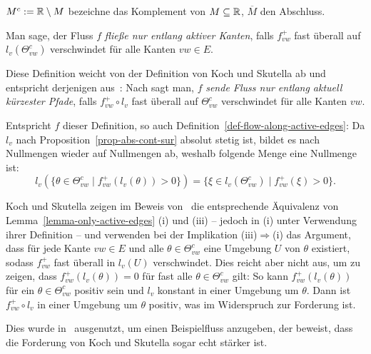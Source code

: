 \begin{notation}
	 $M^c:= \mathbb{R}\setminus M$ bezeichne das Komplement von $M\subseteq\mathbb{R}$, $\overline{M}$ den Abschluss.
\end{notation}

\begin{definition}\label{def-flow-along-active-edges}
	Man sage, der Fluss $f$ \emph{fließe nur entlang aktiver Kanten}, falls $f_{vw}^+$ fast überall auf $l_v(\Theta_{vw}^c)$ verschwindet für alle Kanten $vw\in E$.
\end{definition}

\begin{remark}
	Diese Definition weicht von der Definition von Koch und Skutella ab und entspricht derjenigen aus~\cite[Definition 1]{Cominetti2015}:
	Nach \cite[Definition 2]{Koch2011} sagt man, $f$ \emph{sende Fluss nur entlang aktuell kürzester Pfade}, falls $f_{vw}^+\circ l_v$ fast überall auf $\Theta_{vw}^c$ verschwindet für alle Kanten $vw$.

	Entspricht $f$ dieser Definition, so auch Definition~\ref{def-flow-along-active-edges}: 
	Da $l_v$ nach Proposition~\ref{prop-abs-cont-sur} absolut stetig ist, bildet es nach~\cite[Aufgabe 4.9]{Elstrodt2011Abs} Nullmengen wieder auf Nullmengen ab, weshalb folgende Menge eine Nullmenge ist: \[ l_v(\{ \theta \in \Theta_{vw}^c \mid f_{vw}^+ (l_v(\theta)) > 0 \}) = \{ \xi \in l_v(\Theta_{vw}^c) \mid f_{vw}^+ (\xi) > 0 \}. \]
	 
	Koch und Skutella zeigen im Beweis von~\cite[Lemma 1]{Koch2011} die entsprechende Äquivalenz von Lemma~\ref{lemma-only-active-edges} (i) und (iii) -- jedoch in (i) unter Verwendung ihrer Definition -- und
	verwenden bei der Implikation (iii)$\Rightarrow$(i) das Argument, dass für jede Kante $vw\in E$ und alle $\theta\in \Theta_{vw}^c$ eine Umgebung $U$ von $\theta$ existiert, sodass $f_{vw}^+$ fast überall in $l_v(U)$ verschwindet.
	Dies reicht aber nicht aus, um zu zeigen, dass $f_{vw}^+(l_v(\theta))=0$ für fast alle $\theta\in\Theta_{vw}^c$ gilt:
	So kann $f_{vw}^+(l_v(\theta))$ für ein $\theta\in\Theta_{vw}^c$ positiv sein und $l_v$ konstant in einer Umgebung um $\theta$.
	Dann ist $f_{vw}^+ \circ l_v$ in einer Umgebung um $\theta$ positiv, was im Widerspruch zur Forderung ist.
	
	Dies wurde in~\cite[Example 2]{Cominetti2015} ausgenutzt, um einen Beispielfluss anzugeben, der beweist, dass die Forderung von Koch und Skutella sogar echt stärker ist.
\end{remark}

